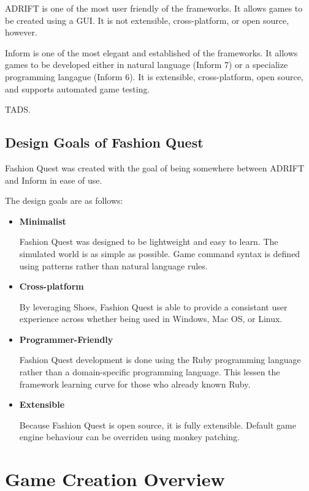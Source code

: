 \documentclass[letterpaper,10pt,english]{manual}
\begin{document}
ADRIFT is one of the most user friendly of the frameworks. It allows games to be created using a GUI. It is not extensible, cross-platform, or open source, however.

Inform is one of the most elegant and established of the frameworks. It allows games to be developed either in natural language (Inform 7) or a specialize programming langague (Inform 6). It is extensible, cross-platform, open source, and supports automated game testing.

TADS.


\section{Design Goals of Fashion Quest}

Fashion Quest was created with the goal of being somewhere between ADRIFT and Inform in ease of use.

The design goals are as follows:
\begin{itemize}
\item {} 
\textbf{Minimalist}

Fashion Quest was designed to be lightweight and easy to learn. The simulated world is as simple as possible. Game command syntax is defined using patterns rather than natural language rules.

\item {} 
\textbf{Cross-platform}

By leveraging Shoes, Fashion Quest is able to provide a consistant user experience across whether being used in Windows, Mac OS, or Linux.

\item {} 
\textbf{Programmer-Friendly}

Fashion Quest development is done using the Ruby programming language rather than a domain-specific programming language. This lessen the framework learning curve for those who already known Ruby.

\item {} 
\textbf{Extensible}

Because Fashion Quest is open source, it is fully extensible. Default game engine behaviour can be overriden using monkey patching.

\end{itemize}

\resetcurrentobjects
\hypertarget{--doc-overview}{}

\chapter{Game Creation Overview}
\end{document}
